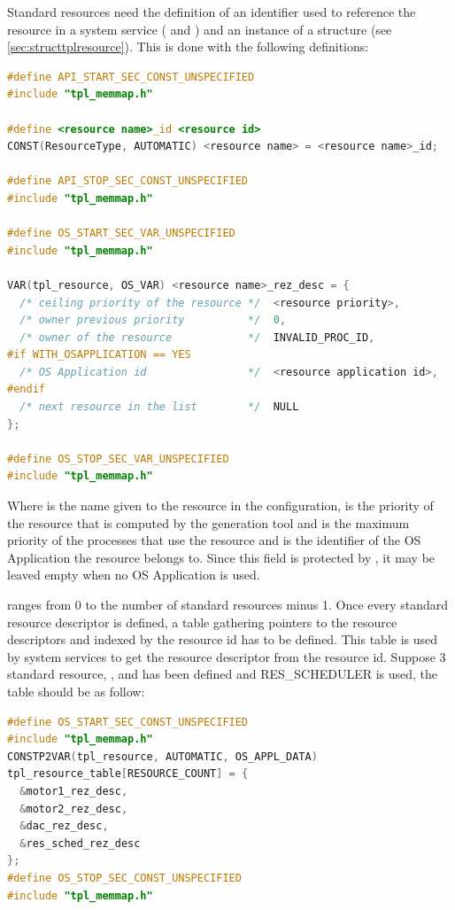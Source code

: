 Standard resources need the definition of an identifier used to reference the resource in a system service ( and ) and an instance of a  structure (see \ref{sec:structtplresource}). This is done with the following definitions:

\begin{lstlisting}[language=C]
#define API_START_SEC_CONST_UNSPECIFIED
#include "tpl_memmap.h"

#define <resource name>_id <resource id>
CONST(ResourceType, AUTOMATIC) <resource name> = <resource name>_id;

#define API_STOP_SEC_CONST_UNSPECIFIED
#include "tpl_memmap.h"

#define OS_START_SEC_VAR_UNSPECIFIED
#include "tpl_memmap.h"

VAR(tpl_resource, OS_VAR) <resource name>_rez_desc = {
  /* ceiling priority of the resource */  <resource priority>,
  /* owner previous priority          */  0,
  /* owner of the resource            */  INVALID_PROC_ID,
#if WITH_OSAPPLICATION == YES
  /* OS Application id                */  <resource application id>,
#endif    
  /* next resource in the list        */  NULL
};

#define OS_STOP_SEC_VAR_UNSPECIFIED
#include "tpl_memmap.h"
\end{lstlisting}

Where  is the name given to the resource in the configuration,  is the priority of the resource that is computed by the generation tool and is the maximum priority of the processes that use the resource and  is the identifier of the OS Application the resource belongs to. Since this field is protected by , it may be leaved empty when no OS Application is used.

 ranges from 0 to the number of standard resources minus 1. Once every standard resource descriptor is defined, a table gathering pointers to the resource descriptors and indexed by the resource id has to be defined. This table is used by system services to get the resource descriptor from the resource id. Suppose 3 standard resource, ,  and  has been defined and RES_SCHEDULER is used, the table should be as follow:

\begin{lstlisting}[language=C]
#define OS_START_SEC_CONST_UNSPECIFIED
#include "tpl_memmap.h"
CONSTP2VAR(tpl_resource, AUTOMATIC, OS_APPL_DATA)
tpl_resource_table[RESOURCE_COUNT] = {
  &motor1_rez_desc,
  &motor2_rez_desc,
  &dac_rez_desc,
  &res_sched_rez_desc  
};
#define OS_STOP_SEC_CONST_UNSPECIFIED
#include "tpl_memmap.h"
\end{lstlisting}

